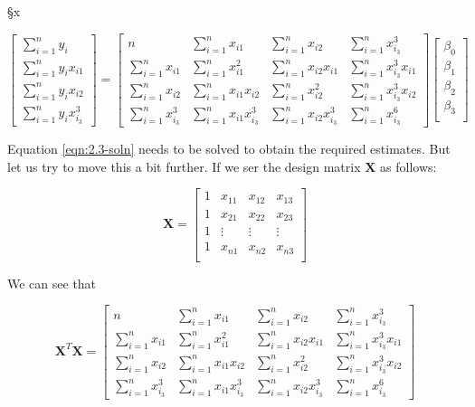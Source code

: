 §x\documentclass[]{article}
\begin{document}
\begin{equation}
\label{eqn:2.3-soln}
	\begin{bmatrix}
		\sum_{i=1}^{n}y_i \\
		\sum_{i=1}^{n}y_ix_{i1}\\
		\sum_{i=1}^{n}y_ix_{i2}\\
		\sum_{i=1}^{n}y_ix_{i_3}^3
	\end{bmatrix}
	=
	\begin{bmatrix}
		n  							& \sum_{i=1}^{n} x_{i1} 			& \sum_{i=1}^{n} x_{i2} 			& \sum_{i=1}^{n} x_{i_3}^3 \\
		\sum_{i=1}^{n} x_{i1}  		& \sum_{i=1}^{n} x_{i1}^2 			& \sum_{i=1}^{n} x_{i2}x_{i1}		& \sum_{i=1}^{n} x_{i_3}^3x_{i1} \\
		\sum_{i=1}^{n} x_{i2}  		& \sum_{i=1}^{n} x_{i1}x_{i2} 		& \sum_{i=1}^{n} x_{i2}^2 			& \sum_{i=1}^{n} x_{i_3}^3x_{i2} \\
		\sum_{i=1}^{n} x_{i_3}^3	& \sum_{i=1}^{n} x_{i1}x_{i_3}^3 	& \sum_{i=1}^{n} x_{i2}x_{i_3}^3 	& \sum_{i=1}^{n} x_{i_3}^6
	\end{bmatrix}
	\begin{bmatrix}
		\beta_0\\
		\beta_1\\
		\beta_2\\
		\beta_3\\
	\end{bmatrix}
\end{equation}


\noindent Equation \ref{eqn:2.3-soln} needs to be solved to obtain the required estimates. But let us try to move this a bit further. If we ser the design matrix $\textbf{X}$ as follows:

$$
\textbf{X}
=
\begin{bmatrix}
1	& x_{11}	& x_{12}	& x_{13} \\
1	& x_{21}	& x_{22}	& x_{23} \\
1	& \vdots	& \vdots	& \vdots \\
1	& x_{n1}	& x_{n2}	& x_{n3} \\
\end{bmatrix}
$$

\noindent We can see that

$$
\textbf{X}^T \textbf{X}
=
\begin{bmatrix}
	n  							& \sum_{i=1}^{n} x_{i1} 			& \sum_{i=1}^{n} x_{i2} 			& \sum_{i=1}^{n} x_{i_3}^3 \\
	\sum_{i=1}^{n} x_{i1}  		& \sum_{i=1}^{n} x_{i1}^2 			& \sum_{i=1}^{n} x_{i2}x_{i1}		& \sum_{i=1}^{n} x_{i_3}^3x_{i1} \\
	\sum_{i=1}^{n} x_{i2}  		& \sum_{i=1}^{n} x_{i1}x_{i2} 		& \sum_{i=1}^{n} x_{i2}^2 			& \sum_{i=1}^{n} x_{i_3}^3x_{i2} \\
	\sum_{i=1}^{n} x_{i_3}^3	& \sum_{i=1}^{n} x_{i1}x_{i_3}^3 	& \sum_{i=1}^{n} x_{i2}x_{i_3}^3 	& \sum_{i=1}^{n} x_{i_3}^6
\end{bmatrix}
$$
\end{document}
